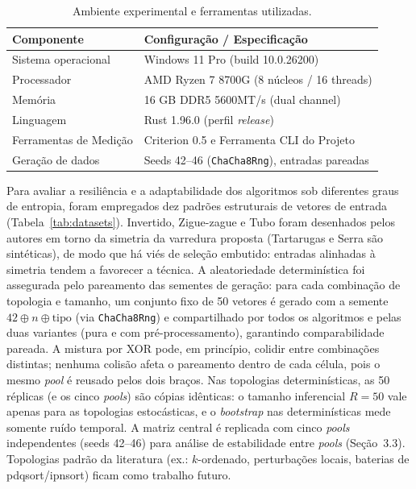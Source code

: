 \documentclass[portuguese]{sbc2025}%
\begin{document}
\begin{table}[htbp]
\centering
\caption{Ambiente experimental e ferramentas utilizadas.}
\label{tab:ambiente}
\begin{tabularx}{\columnwidth}{@{}lX@{}}
\hline
\textbf{Componente} & \textbf{Configuração / Especificação} \\
\hline
Sistema operacional & Windows 11 Pro (build 10.0.26200) \\
Processador & AMD Ryzen 7 8700G (8 núcleos / 16 threads) \\
Memória & 16 GB DDR5 5600MT/s (dual channel) \\
Linguagem & Rust 1.96.0 (perfil \emph{release}) \\
Ferramentas de Medição & Criterion 0.5 e Ferramenta CLI do Projeto \\
Geração de dados & Seeds 42--46 (\texttt{ChaCha8Rng}), entradas pareadas \\
\hline
\end{tabularx}
\end{table}

Para avaliar a resiliência e a adaptabilidade dos algoritmos sob diferentes graus de entropia, foram empregados dez padrões estruturais de vetores de entrada (Tabela~\ref{tab:datasets}). Invertido, Zigue-zague e Tubo foram desenhados pelos autores em torno da simetria da varredura proposta (Tartarugas e Serra são sintéticas), de modo que há viés de seleção embutido: entradas alinhadas à simetria tendem a favorecer a técnica. A aleatoriedade determinística foi assegurada pelo pareamento das sementes de geração: para cada combinação de topologia e tamanho, um conjunto fixo de 50 vetores é gerado com a semente $42 \oplus n \oplus \text{tipo}$ (via \texttt{ChaCha8Rng}) e compartilhado por todos os algoritmos e pelas duas variantes (pura e com pré-processamento), garantindo comparabilidade pareada. A mistura por XOR pode, em princípio, colidir entre combinações distintas; nenhuma colisão afeta o pareamento dentro de cada célula, pois o mesmo \emph{pool} é reusado pelos dois braços. Nas topologias determinísticas, as 50 réplicas (e os cinco \emph{pools}) são cópias idênticas: o tamanho inferencial $R{=}50$ vale apenas para as topologias estocásticas, e o \emph{bootstrap} nas determinísticas mede somente ruído temporal. A matriz central é replicada com cinco \emph{pools} independentes (seeds 42--46) para análise de estabilidade entre \emph{pools} (Seção~3.3). Topologias padrão da literatura (ex.: $k$-ordenado, perturbações locais, baterias de pdqsort/ipnsort) ficam como trabalho futuro.
\end{document}
